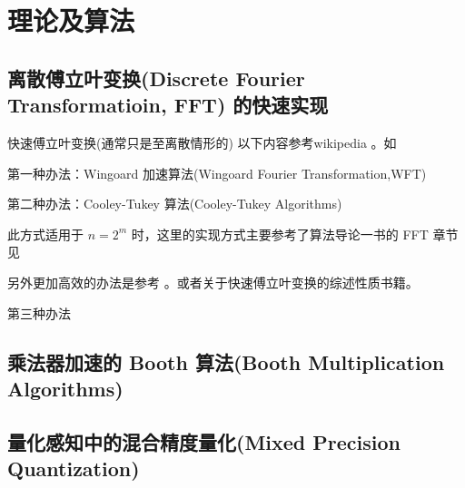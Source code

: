 \section{理论及算法}

\subsection{离散傅立叶变换(Discrete Fourier Transformatioin, FFT) 的快速实现}

快速傅立叶变换(通常只是至离散情形的)
以下内容参考wikipedia 。如



第一种办法：Wingoard 加速算法(Wingoard Fourier Transformation,WFT)

第二种办法：Cooley-Tukey 算法(Cooley-Tukey Algorithms)

此方式适用于 $n= 2^m$ 时，这里的实现方式主要参考了算法导论一书的 FFT 章节见 \cite[Polynomials and FFT]{Cormen2022}

另外更加高效的办法是参考 \cite{Li2010}。或者关于快速傅立叶变换的综述性质书籍\cite{Nussbaumer1982}。

第三种办法
\subsection{乘法器加速的 Booth 算法(Booth Multiplication Algorithms)}


\subsection{量化感知中的混合精度量化(Mixed Precision Quantization)}


